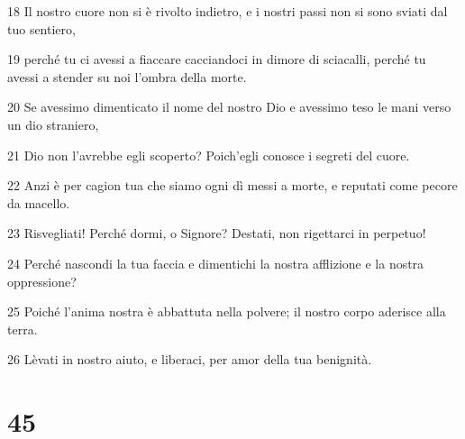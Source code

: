 \par 18 Il nostro cuore non si è rivolto indietro, e i nostri passi non si sono sviati dal tuo sentiero,
\par 19 perché tu ci avessi a fiaccare cacciandoci in dimore di sciacalli, perché tu avessi a stender su noi l'ombra della morte.
\par 20 Se avessimo dimenticato il nome del nostro Dio e avessimo teso le mani verso un dio straniero,
\par 21 Dio non l'avrebbe egli scoperto? Poich'egli conosce i segreti del cuore.
\par 22 Anzi è per cagion tua che siamo ogni dì messi a morte, e reputati come pecore da macello.
\par 23 Risvegliati! Perché dormi, o Signore? Destati, non rigettarci in perpetuo!
\par 24 Perché nascondi la tua faccia e dimentichi la nostra afflizione e la nostra oppressione?
\par 25 Poiché l'anima nostra è abbattuta nella polvere; il nostro corpo aderisce alla terra.
\par 26 Lèvati in nostro aiuto, e liberaci, per amor della tua benignità.

\chapter{45}

